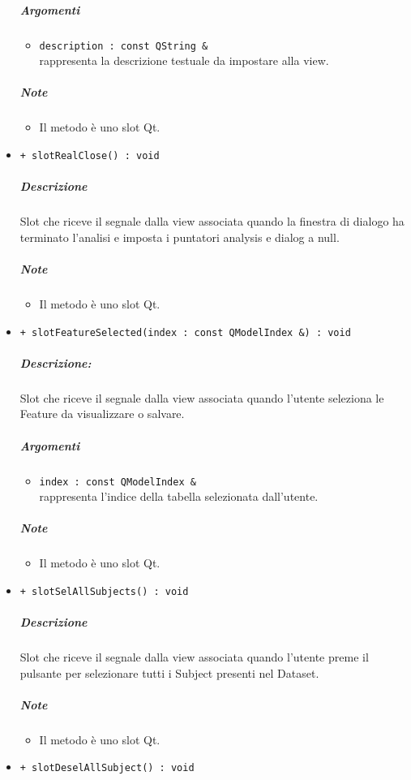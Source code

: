 \begin{itemize}
			\color{black}
			\subparagraph{Argomenti}
			\begin{itemize}
				\item \color{RoyalPurple} \verb!description : const QString &!\\				
\color{black} rappresenta la descrizione testuale da impostare alla view.
			\end{itemize}
			\subparagraph{Note}
			\begin{itemize}
				\item Il metodo è uno slot\g{} Qt\g{}.
			\end{itemize}
			\item \color{blue} \verb!+ slotRealClose() : void!
			\color{black}
			\subparagraph{Descrizione} Slot\g{} che riceve il segnale dalla view associata quando la finestra di dialogo ha terminato l'analisi e imposta i puntatori analysis e dialog a null.
			\subparagraph{Note}
			\begin{itemize}
				\item Il metodo è uno slot\g{} Qt\g{}.
			\end{itemize}
			\item \color{blue} \verb!+ slotFeatureSelected(index : const QModelIndex &) : void!
			\color{black}
			\subparagraph{Descrizione:} Slot\g{} che riceve il segnale dalla view associata quando l'utente seleziona le Feature\g{} da visualizzare o salvare.
			\color{black}
			\subparagraph{Argomenti}
			\begin{itemize}
				\item \color{RoyalPurple} \verb!index : const QModelIndex &!\\				
\color{black} rappresenta l'indice della tabella selezionata dall'utente.
			\end{itemize}
			\subparagraph{Note}
			\begin{itemize}
				\item Il metodo è uno slot\g{} Qt\g{}.
			\end{itemize}
			\item \color{blue} \verb!+ slotSelAllSubjects() : void!
			\color{black}
			\subparagraph{Descrizione} Slot\g{} che riceve il segnale dalla view associata quando l'utente preme il pulsante per selezionare tutti i Subject\g{} presenti nel Dataset\g{}.
			\subparagraph{Note}
			\begin{itemize}
				\item Il metodo è uno slot\g{} Qt\g{}.
			\end{itemize}
			\item \color{blue} \verb!+ slotDeselAllSubject() : void!

\end{itemize}
